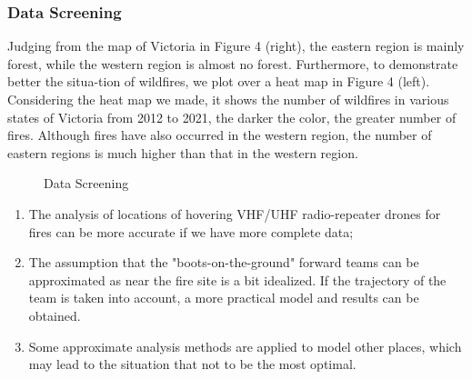 \documentclass[12pt]{article}  %
\begin{document}
\subsubsection{Data Screening}
Judging from the map of Victoria in Figure 4 (right), the eastern region is mainly forest, while the western region is almost no forest. Furthermore, to demonstrate better the situa-tion of wildfires, we plot over a heat map in Figure 4 (left).
Considering the heat map we made, it shows the number of wildfires in various states of Victoria from 2012 to 2021, the darker the color, the greater number of fires. Although fires have also occurred in the western region, the number of eastern regions is much higher than that in the western region.

\begin{figure}[htbp]
    \centering
    \caption{Data Screening} %
\end{figure}

\begin{enumerate}[\bfseries 1.]
    \setlength{\parsep}{0ex} %
    \setlength{\topsep}{0ex} %
    \setlength{\itemsep}{0ex} %
    \item The analysis of locations of hovering VHF/UHF radio-repeater drones for fires can be more accurate if we have more complete data;
    \item The assumption that the "boots-on-the-ground" forward teams can be approximated as near the fire site is a bit idealized. If the trajectory of the team is taken into account, a more practical model and results can be obtained.
    \item Some approximate analysis methods are applied to model other places, which may lead to the situation that not to be the most optimal.
\end{enumerate}
\end{document}
